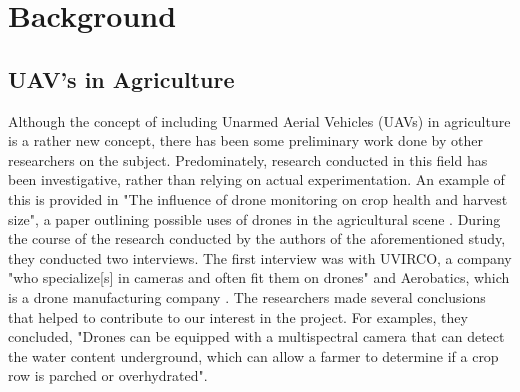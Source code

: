 \section{Background}
\subsection{UAV's in Agriculture}
Although the concept of including Unarmed Aerial Vehicles (UAVs) in agriculture is a rather new concept, there has been some preliminary work done by other researchers on the subject.
Predominately, research conducted in this field has been investigative, rather than relying on actual experimentation.
An example of this is provided in "The influence of drone monitoring on crop health and harvest size", a paper outlining possible uses of drones in the agricultural scene \cite{Reinecke2017}.
During the course of the research conducted by the authors of the aforementioned study, they conducted two interviews. 
The first interview was with UVIRCO, a company "who specialize[s] in cameras and often fit them on drones" and Aerobatics, which is a drone manufacturing company \cite{Reinecke2017}.
The researchers made several conclusions that helped to contribute to our interest in the project.
For examples, they concluded, "Drones can be equipped with a multispectral camera that can detect the water content underground, which can allow a farmer to determine if a crop row is parched or overhydrated".
